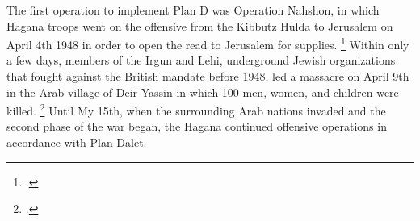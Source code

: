 \documentclass{turabian-researchpaper}
\begin{document}
The first operation to implement Plan D was Operation Nahshon, in which Hagana troops went on the offensive from the Kibbutz Hulda to Jerusalem on April 4th 1948 in order to open the read to Jerusalem for supplies.
\footcite[][121]{morris}
Within only a few days, members of the Irgun and Lehi, underground Jewish organizations that fought against the British mandate before 1948, led a massacre on April 9th in the Arab village of Deir Yassin in which 100 men, women, and children were killed.
\footcite{nabka}
Until My 15th, when the surrounding Arab nations invaded and the second phase of the war began, the Hagana continued offensive operations in accordance with Plan Dalet.

\printbibliography{}
\end{document}
